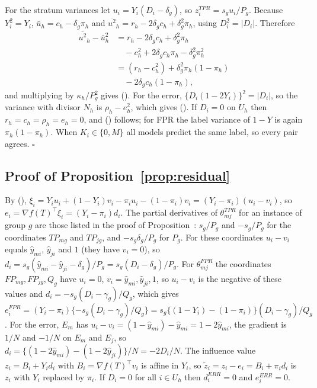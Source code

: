 For the stratum variances let $u_i=Y_i(D_i-\delta_g)$, so $z^{TPR}_i=s_gu_i/P_g$. Because
$Y_i^2=Y_i$, $\bar u_h=c_h-\delta_g\pi_h$ and $\overline{u^2}_h=r_h-2\delta_gc_h+\delta_g^2\pi_h$,
using $D_i^2=|D_i|$. Therefore
\begin{align*}
\overline{u^2}_h-\bar u_h^2&=r_h-2\delta_gc_h+\delta_g^2\pi_h\\
&\quad-c_h^2+2\delta_gc_h\pi_h-\delta_g^2\pi_h^2\\
&=(r_h-c_h^2)+\delta_g^2\pi_h(1-\pi_h)\\
&\quad-2\delta_gc_h(1-\pi_h),
\end{align*}
and multiplying by $\kappa_h/P_g^2$ gives (). For the error,
$\{D_i(1-2Y_i)\}^2=|D_i|$, so the variance with divisor $N_h$ is $\rho_h-e_h^2$, which gives
(). If $D_i=0$ on $U_h$ then $r_h=c_h=\rho_h=e_h=0$, and ()
follows; for FPR the label variance of $1-Y$ is again $\pi_h(1-\pi_h)$. When $K_i\in\{0,M\}$ all
models predict the same label, so every pair agrees. $\square$

\subsection{Proof of Proposition~\ref{prop:residual}}

By (), $\xi_i=Y_iu_i+(1-Y_i)v_i-\pi_iu_i-(1-\pi_i)v_i=(Y_i-\pi_i)(u_i-v_i)$, so $e_i=\nabla f(T)^\top\xi_i=(Y_i-\pi_i)d_i$. The partial derivatives of
$\theta^{TPR}_{mj}$ for an instance of group $g$ are those listed in the proof of Proposition~: $s_g/P_g$ and $-s_g/P_g$ for the coordinates $TP_{mg}$ and
$TP_{jg}$, and $-s_g\delta_g/P_g$ for $P_g$. For these coordinates $u_i-v_i$ equals $\hat y_{mi}$, $\hat y_{ji}$ and $1$ (they have $v_i=0$), so
$d_i=s_g(\hat y_{mi}-\hat y_{ji}-\delta_g)/P_g=s_g(D_i-\delta_g)/P_g$. For $\theta^{FPR}_{mj}$ the coordinates $FP_{mg},FP_{jg},Q_g$ have $u_i=0$, $v_i=\hat y_{mi},\hat y_{ji},1$,
so $u_i-v_i$ is the negative of these values and $d_i=-s_g(D_i-\gamma_g)/Q_g$, which gives $e^{FPR}_i=(Y_i-\pi_i)\{-s_g(D_i-\gamma_g)/Q_g\}=s_g\{(1-Y_i)-(1-\pi_i)\}(D_i-\gamma_g)/Q_g$. For the error,
$E_m$ has $u_i-v_i=(1-\hat y_{mi})-\hat y_{mi}=1-2\hat y_{mi}$, the gradient is $1/N$ and $-1/N$ on $E_m$ and $E_j$, so $d_i=\{(1-2\hat y_{mi})-(1-2\hat y_{ji})\}/N=-2D_i/N$. The influence value
$z_i=B_i+Y_id_i$ with $B_i=\nabla f(T)^\top v_i$ is affine in $Y_i$, so $\tilde z_i=z_i-e_i=B_i+\pi_id_i$ is $z_i$ with $Y_i$ replaced by $\pi_i$. If $D_i=0$ for all $i\in U_h$ then $d^{ERR}_i=0$ and $e^{ERR}_i=0$.

